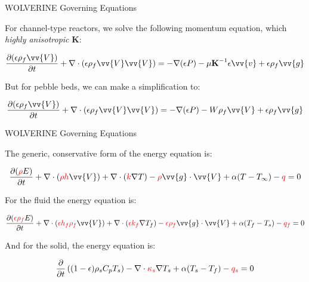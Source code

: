 \documentclass{beamer}
\begin{document}

\begin{frame}{WOLVERINE Governing Equations}

For channel-type reactors, we solve the following momentum equation, which \textit{highly anisotropic} \textbf{K}:

\begin{equation}
\frac{\partial(\epsilon\rho_f\vv{V})}{\partial t}+\nabla\cdot(\epsilon\rho_f\vv{V}\vv{V})=-\nabla(\epsilon P)-\mu \textbf{K}^{-1}\epsilon\vv{v}+\epsilon\rho_f\vv{g}
\end{equation}

But for pebble beds, we can make a simplification to:

\begin{equation}
\frac{\partial(\epsilon\rho_f\vv{V})}{\partial t}+\nabla\cdot(\epsilon\rho_f\vv{V}\vv{V})=-\nabla(\epsilon P)-W\rho_f\vv{V}+\epsilon\rho_f\vv{g}
\end{equation}

\end{frame}


\begin{frame}{WOLVERINE Governing Equations}

The generic, conservative form of the energy equation is:

\begin{equation}
\frac{\partial(\color{red}\rho\color{black} E)}{\partial t}+\nabla\cdot(\color{red}\rho h\color{black}\vv{V})+\nabla\cdot(\color{red}k\color{black}\nabla T)- \color{red}\rho\color{black}\vv{g}\cdot\vv{V}+\alpha(T-T_\infty)-\color{red}q\color{black}=0
\end{equation}

For the fluid the energy equation is:

\begin{equation}
\frac{\partial(\color{red}\epsilon\rho_f\color{black} E)}{\partial t}+\nabla\cdot(\color{red}\epsilon h_f\rho_f\color{black}\vv{V})+\nabla\cdot(\color{red}\epsilon k_f\color{black}\nabla T_f) -\color{red}\epsilon\rho_f\color{black} \vv{g}\cdot\vv{V}+\alpha(T_f-T_s)-\color{red}q_f\color{black}=0
\end{equation}

And for the solid, the energy equation is:

\begin{equation}
\frac{\partial}{\partial t} \left((1-\epsilon)\rho_s C_pT_s\right)-\nabla\cdot \color{red}\kappa_s\color{black}\nabla T_s+\alpha(T_s-T_f)-\color{red}q_s\color{black}=0
\end{equation}

\end{frame}
\end{document}
